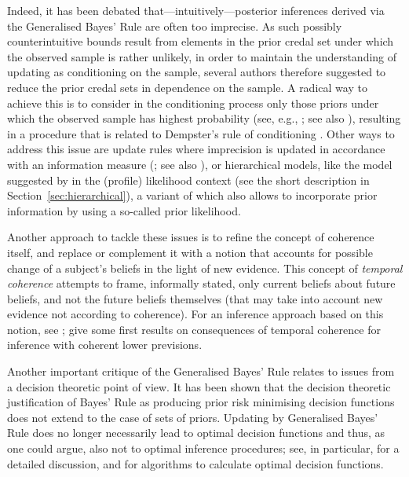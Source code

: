 Indeed, it has been debated that---intuitively---posterior inferences derived via the Generalised Bayes' Rule are often too imprecise.
As such possibly counterintuitive bounds result from elements in the prior credal set under which the observed sample is rather unlikely,
in order to maintain the understanding of updating as conditioning on the sample,
several authors therefore suggested to reduce the prior credal sets in dependence on the sample.
A radical way to achieve this is to consider in the conditioning process only those priors
under which the observed sample has highest probability (see, e.g., \cite{2007:held}; see also \cite{1982:walley}),
resulting in a procedure that is related to Dempster's rule of conditioning \parencite[see, e.g.,][\S 3.2]{itip-other}.
Other ways to address this issue are update rules where imprecision is updated in accordance with an information measure 
(\cite{1993:coolen, 1994:coolen}; see also \cite{1994:coolen::phd}), or hierarchical models,
like the model suggested by \textcite{2008:cattaneo} in the (profile) likelihood context
(see the short description in Section~\ref{sec:hierarchical}),
a variant of which also allows to incorporate prior information by using a so-called prior likelihood.

Another approach to tackle these issues is to refine the concept of coherence itself,
and replace or complement it with a notion that accounts for possible change of a subject's beliefs
in the light of new evidence. This concept of \emph{temporal coherence} \parencite{1985:goldstein::temporal}
attempts to frame, informally stated, only current beliefs about future beliefs,
and not the future beliefs themselves (that may take into account new evidence not according to coherence).
For an inference approach based on this notion, see
\textcite{2007:goldstein:wooff::bayeslinear}; 
\textcite{2013:troffaes:goldstein} give some first results on consequences of temporal coherence
for inference with coherent lower previsions.

Another important critique of the Generalised Bayes' Rule relates to issues from a decision theoretic point of view.
It has been shown that the decision theoretic justification of Bayes' Rule
as producing prior risk minimising decision functions does not extend to the case of sets of priors.
Updating by Generalised Bayes' Rule does no longer necessarily lead to optimal decision functions and thus, as one could argue,
also not to optimal inference procedures; see, in particular, \textcite{2003:augustin} for a detailed discussion, 
\textcite{2001:NoubiapSeidel} and \textcite{Augustin5:2004} for algorithms to calculate optimal decision functions.



